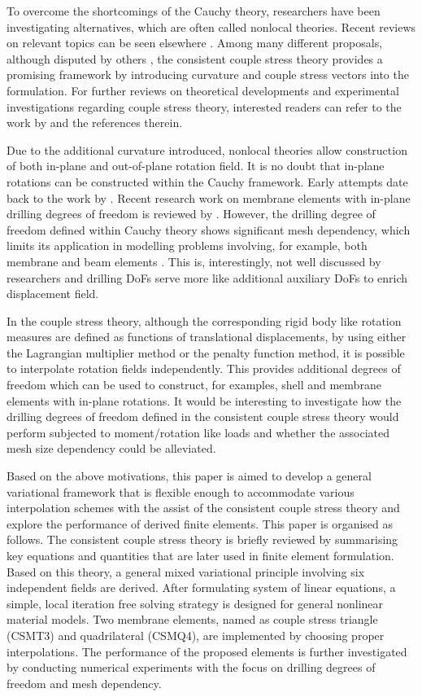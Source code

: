 \documentclass[3p,sort&compress,11pt,fleqn]{elsarticle}
\begin{document}
To overcome the shortcomings of the Cauchy theory, researchers have been investigating alternatives, which are often called nonlocal theories. Recent reviews on relevant topics can be seen elsewhere \citep{Shaat2020}. Among many different proposals, although disputed by others \citep{Neff2016}, the consistent couple stress theory \citep{Hadjesfandiari2011} provides a promising framework by introducing curvature and couple stress vectors into the formulation. For further reviews on theoretical developments and experimental investigations regarding couple stress theory, interested readers can refer to the work by \citet{Pedgaonkar2021} and the references therein.

Due to the additional curvature introduced, nonlocal theories allow construction of both in-plane and out-of-plane rotation field. It is no doubt that in-plane rotations can be constructed within the Cauchy framework. Early attempts date back to the work by \citet{Allman1984}. Recent research work on membrane elements with in-plane drilling degrees of freedom is reviewed by \citet{Boutagouga2020}. However, the drilling degree of freedom defined within Cauchy theory shows significant mesh dependency, which limits its application in modelling problems involving, for example, both membrane and beam elements \citep{Chang2020}. This is, interestingly, not well discussed by researchers and drilling DoFs serve more like additional auxiliary DoFs to enrich displacement field.

In the couple stress theory, although the corresponding rigid body like rotation measures are defined as functions of translational displacements, by using either the Lagrangian multiplier method or the penalty function method, it is possible to interpolate rotation fields independently. This provides additional degrees of freedom which can be used to construct, for examples, shell and membrane elements with in-plane rotations. It would be interesting to investigate how the drilling degrees of freedom defined in the consistent couple stress theory would perform subjected to moment/rotation like loads and whether the associated mesh size dependency could be alleviated.

Based on the above motivations, this paper is aimed to develop a general variational framework that is flexible enough to accommodate various interpolation schemes with the assist of the consistent couple stress theory \citep{Hadjesfandiari2011} and explore the performance of derived finite elements. This paper is organised as follows. The consistent couple stress theory is briefly reviewed by summarising key equations and quantities that are later used in finite element formulation. Based on this theory, a general mixed variational principle involving six independent fields are derived. After formulating system of linear equations, a simple, local iteration free solving strategy is designed for general nonlinear material models. Two membrane elements, named as couple stress triangle (CSMT3) and quadrilateral (CSMQ4), are implemented by choosing proper interpolations. The performance of the proposed elements is further investigated by conducting numerical experiments with the focus on drilling degrees of freedom and mesh dependency.
\end{document}
